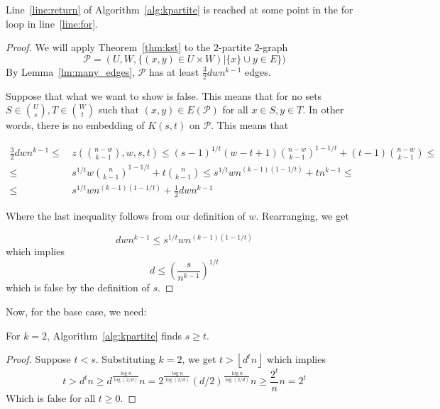 \begin{lemma}\label{lm:return}
    Line~\ref{line:return} of Algorithm~\ref{alg:kpartite} is reached at some point in the for
    loop in line~\ref{line:for}.
    \begin{proof}
        We will apply Theorem~\ref{thm:kst} to the $2$-partite $2$-graph
        \[
            \mathcal{P} = (U, W, \{(x, y) \in U \times W) | \{x\} \cup y \in E \})
        \]
        By Lemma~\ref{lm:many_edges}, $\mathcal{P}$ has at least
        $\frac{3}{2}dwn^{k-1}$ edges.

        Suppose that what we want to show is false.
        This means that for no sets $S \in \binom{U}{s}, T \in \binom{W}{t}$
        such that $(x, y) \in E (\mathcal{P})$ for all $x \in S, y \in T $.
        In other words, there is no embedding of $K(s, t)$ on $\mathcal{P}$.
        This means that


        \begin{align*}
            \frac{3}{2}dwn^{k-1} \leq &
            \, z \left(\binom{n - w}{k-1}, w, s, t  \right) \leq
            (s-1)^{1/t}(w-t+1)\binom{n-w}{k-1}^{1-1/t} + (t-1)\binom{n-w}{k-1} \leq \\
            \leq & \, s^{1/t} w \binom{n}{k-1}^{1-1/t} + t \binom{n}{k-1} \leq
             s^{1/t} wn^{(k-1)(1-1/t)} + tn^{k-1} \leq \\
            \leq & \, s^{1/t} wn^{(k-1)(1-1/t)} + \frac{1}{2} dwn^{k-1}
        \end{align*}

        Where the last inequality follows from our definition of $w$.
        Rearranging, we get

        \[
            dwn^{k-1} \leq s^{1/t} wn^{(k-1)(1-1/t)}
        \]
        which implies
        \[
            d \leq \left(\frac{s}{n^{k-1}}\right)^{1/t}
        \]
        which is false by the definition of $s$.
    \end{proof}
\end{lemma}

Now, for the base case, we need:

\begin{lemma}\label{lm:base_case}
    For $k=2$, Algorithm~\ref{alg:kpartite} finds $s \geq t$.
    \begin{proof}
        Suppose $t < s$.
        Substituting $k=2$, we get $t > \left\lfloor d^t n \right\rfloor$ which implies
        \[
            t >
            d^t n \geq
            d^{\frac{\log n}{\log (2/d)}} n =
            2^{\frac{\log n}{\log (2/d)}}(d/2)^{\frac{\log n}{\log (2/d)}} n \geq
            \frac{2^t}{n} n =
            2^t
        \]
        Which is false for all $t \geq 0$.
    \end{proof} %
\end{lemma}

